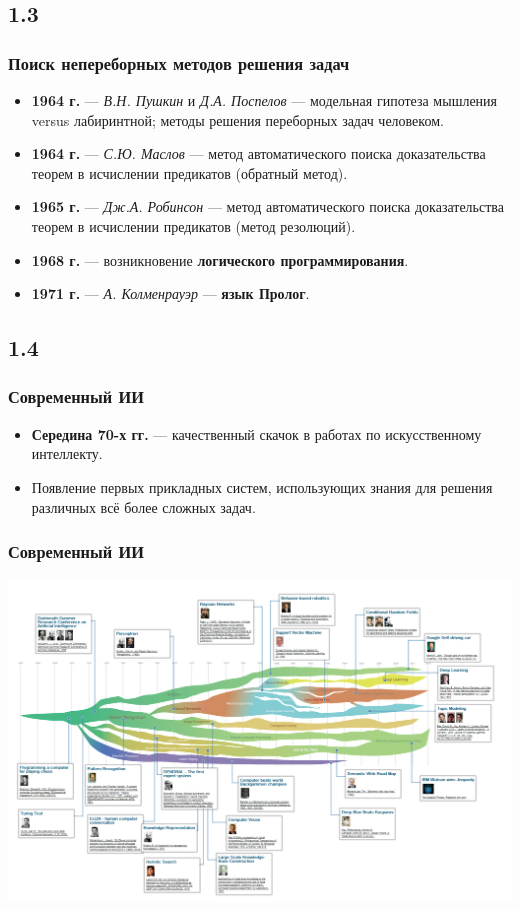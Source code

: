 \documentclass[default]{beamer}
\begin{document}
	\subsection{1.3}
	\begin{frame}
		\frametitle{Поиск непереборных методов решения задач}
		
		\begin{itemize}
			\item \textbf{1964 г.} --- \textit{В.Н. Пушкин} и \textit{Д.А. Поспелов}  --- модельная гипотеза мышления versus лабиринтной; методы решения переборных задач человеком. 
			\item \textbf{1964 г.} --- \textit{С.Ю. Маслов} --- метод автоматического поиска доказательства теорем в исчислении предикатов (обратный метод).
			\item \textbf{1965 г.} --- \textit{Дж.А. Робинсон} --- метод автоматического поиска доказательства теорем в исчислении предикатов (метод резолюций).
			\item \textbf{1968 г.} --- возникновение \textbf{логического программирования}.
			\item \textbf{1971 г.} --- \textit{А. Колменрауэр} --- \textbf{язык Пролог}.
			
		\end{itemize}
	\end{frame}

	\subsection{1.4}
	\begin{frame}
		\frametitle{Современный ИИ}
		\Large
		\begin{itemize}
			\item \textbf{Середина 70-х гг.} --- качественный скачок в работах по искусственному интеллекту.
			\item Появление  первых прикладных систем, использующих знания для решения различных всё более сложных задач.
		\end{itemize}
	\end{frame}

	\begin{frame}
	\frametitle{Современный ИИ}
		\centering
		\includegraphics[width=\textwidth]{ai-1.png}
	\end{frame}
\end{document}
